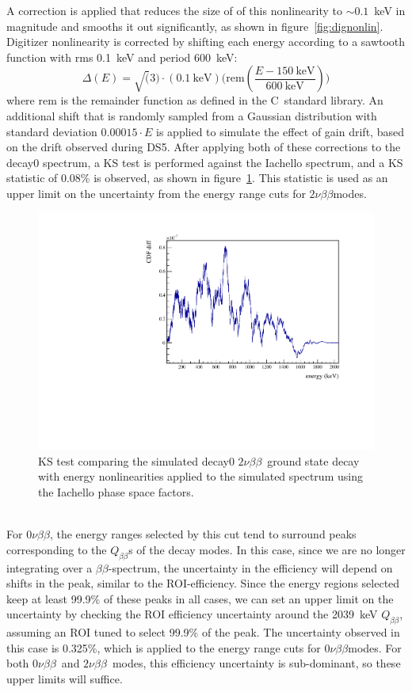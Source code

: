 \documentclass[notitlepage,rmp,aps,10pt]{revtex4-1}
\newcommand{\bb}{${\beta \beta}$}
\newcommand{\znbb}{${0 \nu \beta \beta}$}
\newcommand{\tnbb}{${2 \nu \beta \beta}$}
\newcommand{\Qbb}{$Q_{\beta\beta}$}
\newcommand{\cpp}{C\protect\raisebox{.25ex}{++}\ }  %
\begin{document}
A correction is applied that reduces the size of of this nonlinearity to $\sim0.1$~keV in magnitude and smooths it out significantly, as shown in figure~\ref{fig:dignonlin}.
Digitizer nonlinearity is corrected by shifting each energy according to a sawtooth function with rms 0.1~keV and period 600~keV:
\begin{equation}
  \Delta(E) = \sqrt(3)\cdot (0.1~\mathrm{keV}) \big(\mathrm{rem}(\frac{E-150~\mathrm{keV}}{600~\mathrm{keV}}) \big)
\end{equation}
where $\mathrm{rem}$ is the remainder function as defined in the \cpp standard library.
An additional shift that is randomly sampled from a Gaussian distribution with standard deviation $0.00015\cdot E$ is applied to simulate the effect of gain drift, based on the drift observed during DS5.
After applying both of these corrections to the decay0 spectrum, a KS test is performed against the Iachello spectrum, and a KS statistic of 0.08\% is observed, as shown in figure~\ref{fig:decay0NLCks}.
This statistic is used as an upper limit on the uncertainty from the energy range cuts for \tnbb modes.
\begin{figure}[h]
  \centering
  \includegraphics[width=0.6\linewidth]{decay0KS}
  \caption[KS Test of decay0 spectrum with energy non-linearities vs Iachello spectrum]{\label{fig:decay0NLCks}
    KS test comparing the simulated decay0 \tnbb\ ground state decay with energy nonlinearities applied to the simulated spectrum using the Iachello phase space factors.
  }
\end{figure}
\\
For \znbb, the energy ranges selected by this cut tend to surround peaks corresponding to the \Qbb s of the decay modes.
In this case, since we are no longer integrating over a \bb -spectrum, the uncertainty in the efficiency will depend on shifts in the peak, similar to the ROI-efficiency.
Since the energy regions selected keep at least 99.9\% of these peaks in all cases, we can set an upper limit on the uncertainty by checking the ROI efficiency uncertainty around the 2039~keV \Qbb, assuming an ROI tuned to select 99.9\% of the peak.
The uncertainty observed in this case is 0.325\%, which is applied to the energy range cuts for \znbb modes.
For both \znbb\ and \tnbb\ modes, this efficiency uncertainty is sub-dominant, so these upper limits will suffice.
\\
\end{document}
